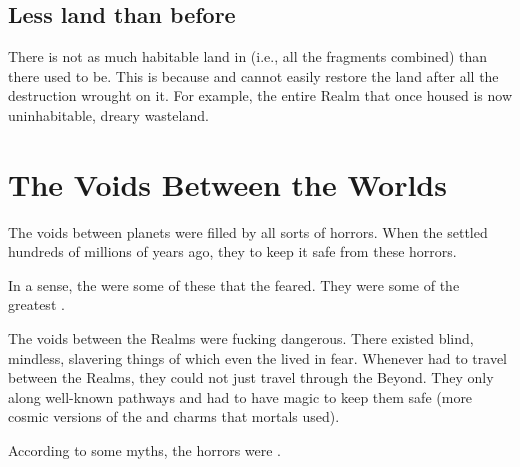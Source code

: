 \subsection{Less land than before}
There is not as much habitable land in \Tembrae{} (i.e., all the fragments combined) than there used to be. 
This is because  and cannot easily restore the land after all the destruction wrought on it. 
For example, the entire Realm that once housed  is now uninhabitable, dreary wasteland. 















\section{The Voids Between the Worlds}
The voids between planets were filled by all sorts of horrors.
When the \voyagers settled \Miith hundreds of millions of years ago, they  to keep it safe from these horrors.

In a sense, the \xss were some of these  that the \voyagers feared.
They were some of the greatest .

The voids between the Realms were fucking dangerous. 
There existed blind, mindless, slavering things of which even the \resphain lived in fear. 
Whenever \resphain had to travel between the Realms, they could not just travel through the Beyond.
They only \travelled along well-known pathways and had to have magic to keep them safe (more cosmic versions of the \eidola and \wylde charms that mortals used).

According to some myths, the horrors were . 


